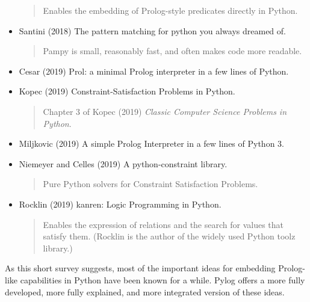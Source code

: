 \begin{itemize}
\begin{quote}
    Enables the embedding of Prolog-style predicates directly in Python. \end{quote}
\item Santini (2018) \cite{Santini2018} The pattern matching for python you always dreamed of.
    \begin{quote}
    Pampy is small, reasonably fast, and often makes code more readable.
    \end{quote}
\item Cesar (2019) \cite{Cesar2019} Prol: a minimal Prolog interpreter in a few lines of Python. 
\item Kopec (2019) \cite{Kopec2019} Constraint-Satisfaction Problems in Python.  
    \begin{quote} Chapter 3 of Kopec (2019) \textit{Classic Computer Science Problems in Python}.
    \end{quote}
\item Miljkovic (2019)\cite{Miljkovic2019} A simple Prolog Interpreter in a few lines of Python 3.
\item Niemeyer and Celles (2019) \cite{Niemeyer2019} A python-constraint library.
    \begin{quote}
    Pure Python solvers for Constraint Satisfaction Problems.
    \end{quote}
\item Rocklin (2019) \cite{Rocklin2019} kanren: Logic Programming in Python.
    \begin{quote}
    Enables the expression of relations and the search for values that satisfy them. (Rocklin is the author of the widely used Python toolz library.)
    \end{quote}
\end{itemize}

As this short survey suggests, most of the important ideas for embedding Prolog-like capabilities in Python have been known for a while. Pylog offers a more fully developed, more fully explained, and more integrated version of these ideas.
